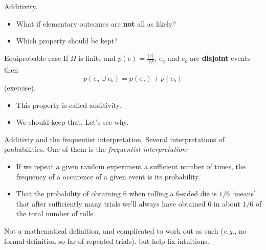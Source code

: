 \documentclass{beamer}
\begin{document}
\begin{frame}{Additivity.}
  \begin{itemize}
  \item What if elementary outcomes are {\bf not} all as likely?
  \item Which property should be kept?
  \end{itemize}

  \begin{block}{Equiprobable case}
    If $\Omega$ is finite and $p(e) = \frac{|e|}{|\Omega|}$, $e_a$ and $e_b$ are {\bf disjoint} events then
    \[p(e_a \cup e_b) = p(e_a) + p(e_b)\] (exercise).
  \end{block}

  \begin{itemize}
  \item This property is called additivity.
  \item We should keep that. Let's see why.
  \end{itemize}
  
\end{frame}

\begin{frame}{Additiviy and the frequentist interpretation.}
Several interpretations of probabilities. One of them is the \emph{frequentist interpretation:}
 
  \begin{itemize}
  \item If we repeat a given random experiment a sufficient number of times, the frequency of a occurence of a given event is its probability.
  \item {\color{darkgreen}  That the probability of obtaining $6$ when rolling a $6$-sided die is $1/6$ `means' that after sufficiently many trials we'll always have obtained $6$ in about $1/6$ of the total number of rolls.}
  \end{itemize}

 Not a mathematical definition, and complicated to work out as such (\emph{e.g.}, no formal definition so far of repeated trials). but help fix intuitions.
\end{frame}
\end{document}
